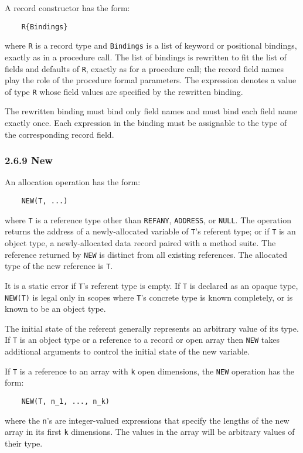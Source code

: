 \documentclass[10pt]{article}
\begin{document}
A record constructor has the form:
\begin{verbatim}
    R{Bindings}
\end{verbatim}
where \verb|R| is a record type and \verb|Bindings| is a list of keyword or
positional bindings, exactly as in a procedure call.  The list of bindings is
rewritten to fit the list of fields and defaults of \verb|R|, exactly as for a
procedure call; the record field names play the role of the procedure formal
parameters.  The expression denotes a value of type \verb|R| whose field
values are specified by the rewritten binding.

The rewritten binding must bind only field names and must bind each field name
exactly once.  Each expression in the binding must be assignable to the type
of the corresponding record field.

\subsubsection*{2.6.9 New}

An allocation operation has the form:
\begin{verbatim}
    NEW(T, ...)
\end{verbatim}
where \verb|T| is a reference type other than \verb|REFANY|, \verb|ADDRESS|,
or \verb|NULL|.  The operation returns the address of a newly-allocated
variable of \verb|T|'s referent type; or if \verb|T| is an object type, a
newly-allocated data record paired with a method suite.  The reference
returned by \verb|NEW| is distinct from all existing references.  The
allocated type of the new reference is \verb|T|.

It is a static error if \verb|T|'s referent type is empty.  If \verb|T| is
declared as an opaque type, \verb|NEW(T)| is legal only in scopes where
\verb|T|'s concrete type is known completely, or is known to be an object
type.

The initial state of the referent generally represents an arbitrary value of
its type.  If \verb|T| is an object type or a reference to a record or open
array then \verb|NEW| takes additional arguments to control the initial state
of the new variable.

If \verb|T| is a reference to an array with \verb|k| open dimensions, the
\verb|NEW| operation has the form:
\begin{verbatim}
    NEW(T, n_1, ..., n_k)
\end{verbatim}
where the \verb|n|'s are integer-valued expressions that specify the lengths
of the new array in its first \verb|k| dimensions.  The values in the array
will be arbitrary values of their type.
\end{document}

